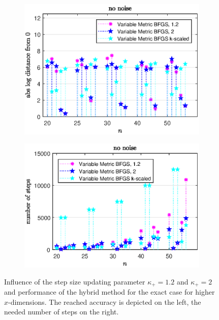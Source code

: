 \vspace{-1.5em}


\begin{figure}[H]%
	\begin{subfigure}{0.49\textwidth}
		\includegraphics[width=\textwidth]{Pictures/Plots/no_noise_compb.eps}%
	\end{subfigure}
	\begin{subfigure}{0.49\textwidth}
		\includegraphics[width=\textwidth]{Pictures/Plots/steps_no_noise_compb.eps}%
	\end{subfigure}
	\label{fig_no_noise_comp_large}
	\caption{Influence of the step size updating parameter \(\kappa_+ = 1.2\) and \(\kappa_+ =2 \) and performance of the hybrid method for the exact case for higher \(x\)-dimensions. The reached accuracy is depicted on the left, the needed number of steps on the right.}
\end{figure}

